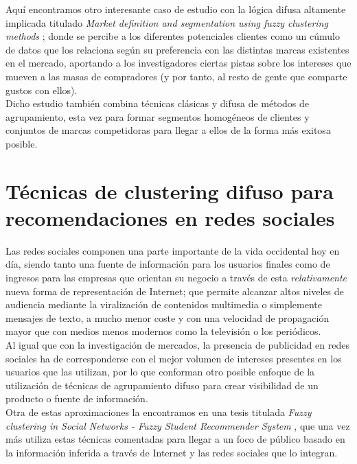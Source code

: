 \documentclass[]{report}
\begin{document}
			Aquí encontramos otro interesante caso de estudio con la lógica difusa altamente implicada titulado \textit{Market definition and segmentation using fuzzy clustering methods} \cite{marketing}; donde se percibe a los diferentes potenciales clientes como un cúmulo de datos que los relaciona según su preferencia con las distintas marcas existentes en el mercado, aportando a los investigadores ciertas pistas sobre los intereses que mueven a las masas de compradores (y por tanto, al resto de gente que comparte gustos con ellos).\\
			
			Dicho estudio también combina técnicas clásicas y difusa de métodos de agrupamiento, esta vez para formar segmentos homogéneos de clientes y conjuntos de marcas competidoras para llegar a ellos de la forma más exitosa posible.
			
		\section{Técnicas de clustering difuso para recomendaciones en redes sociales}
		
			Las redes sociales componen una parte importante de la vida occidental hoy en día, siendo tanto una fuente de información para los usuarios finales como de ingresos para las empresas que orientan su negocio a través de esta \textit{relativamente} nueva forma de representación de Internet; que permite alcanzar altos niveles de audiencia mediante la viralización de contenidos multimedia o simplemente mensajes de texto, a mucho menor coste y con una velocidad de propagación mayor que con medios menos modernos como la televisión o los periódicos.\\
			
			Al igual que con la investigación de mercados, la presencia de publicidad en redes sociales ha de corresponderse con el mejor volumen de intereses presentes en los usuarios que las utilizan, por lo que conforman otro posible enfoque de la utilización de técnicas de agrupamiento difuso para crear visibilidad de un producto o fuente de información.\\
			
			Otra de estas aproximaciones la encontramos en una tesis titulada \textit{Fuzzy clustering in Social Networks - Fuzzy Student Recommender System} \cite{recommendation}, que una vez más utiliza estas técnicas comentadas para llegar a un foco de público basado en la información inferida a través de Internet y las redes sociales que lo integran.
			


\end{document}
